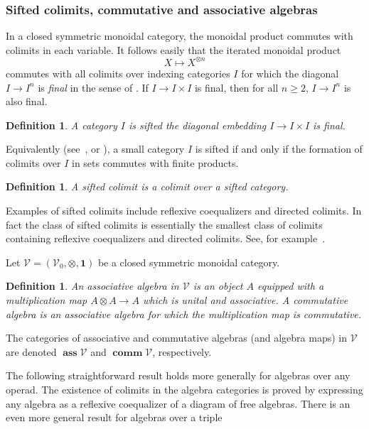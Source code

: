\documentclass{amsart}
\newtheorem{definition}[equation]{Definition}
\newenvironment{defin}{\begin{definition}\rm}{\end{definition}}
\theoremstyle{definition}
\newtheorem{defin}[equation]{Definition}
\theoremstyle{remark}
\newcommand{\cat}[1]{{\mathcal #1}}
\DeclareMathOperator{\comm}{\mathbf{comm}}
\DeclareMathOperator{\ass}{\mathbf{ass}}
\newcommand{\commcat}[1]{\comm\cat #1}
\newcommand{\asscat}[1]{\ass\cat #1}
\newcommand{\one}{\mathbf{1}}
\begin{document}
\subsubsection{Sifted colimits, commutative and associative algebras}
\label{sec:commutative-algebras} 

In a closed symmetric monoidal category, the monoidal product commutes
with colimits in each variable.  It follows easily that the iterated
monoidal product
\[
X\mapsto X^{\otimes n}
\]
commutes with all colimits over indexing categories $I$ for which the
diagonal $I\to I^{n}$ is {\em final} in the sense of \cite[\S
IX.3]{MR1712872}.  If $I\to I\times I$ is final, then for all $n\ge
2$, $I\to I^{n}$ is also final.

\begin{defin}
A category $I$ is {\em sifted} the diagonal embedding $I\to I\times I$
is final.  
\end{defin}

Equivalently (see~\cite[15.2 (c)]{MR0327863}, or \cite[Theorem~2.15]{MR2757312}), a small category $I$ is sifted if
and only if the formation of colimits over $I$ in sets commutes with
finite products.

\begin{defin}
A {\em sifted colimit} is a colimit over a sifted category.
\end{defin}

Examples of sifted colimits include reflexive coequalizers and
directed colimits.  In fact the class of sifted colimits is
essentially the smallest class of colimits containing reflexive
coequalizers and directed colimits.  See, for
example~\cite{adamek:_what_are_sifted_colim, MR0327863}.

Let $\cat V=(\cat V_{0},\otimes,\one)$ be a closed symmetric
monoidal category.  

\begin{defin}
\label{def:30} An {\em associative algebra} in $\cat V$ is an object
$A$ equipped with a multiplication map $A\otimes A\to A$ which is
unital and associative.  A {\em commutative algebra} is an associative
algebra for which the multiplication map is commutative.
\end{defin}

The categories of associative and commutative algebras (and algebra
maps) in $\cat V$ are denoted $\asscat V$ and $\commcat V$,
respectively.

The following straightforward result holds more generally for algebras
over any operad.  The existence of colimits in the algebra categories
is proved by expressing any algebra as a reflexive coequalizer of a
diagram of free algebras.  There is an even more general result for
algebras over a triple~\cite[Proposition~4.3.1]{borceux2}
\end{document}
